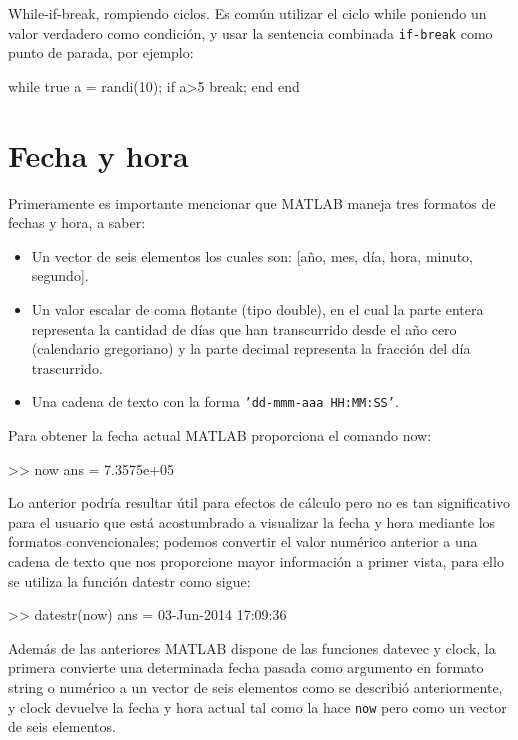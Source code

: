 \begin{informacion}{While-if-break, rompiendo ciclos.}
Es común utilizar el ciclo while poniendo un valor verdadero como condición, y 
usar la sentencia combinada \texttt{if-break} como punto de parada, por ejemplo:

\begin{matlab}
while true
    a = randi(10);
    if a>5
        break;
    end
end
\end{matlab}
\end{informacion}

\section{Fecha y hora}

Primeramente es importante mencionar que MATLAB maneja tres formatos de
fechas y hora, a saber:

\begin{itemize}
\item
  Un vector de seis elementos los cuales son: {[}año, mes, día, hora,
  minuto, segundo{]}.
\item
  Un valor escalar de coma flotante (tipo double), en el cual la parte
  entera representa la cantidad de días que han transcurrido desde el
  año cero (calendario gregoriano) y la parte decimal representa la
  fracción del día trascurrido.
\item
  Una cadena de texto con la forma \texttt{’dd-mmm-aaa\ HH:MM:SS’}.
\end{itemize}

Para obtener la fecha actual MATLAB proporciona el comando now:

\begin{matlab}
>> now
ans =
   7.3575e+05
\end{matlab}

Lo anterior podría resultar útil para efectos de cálculo pero no es tan
significativo para el usuario que está acostumbrado a visualizar la
fecha y hora mediante los formatos convencionales; podemos convertir el
valor numérico anterior a una cadena de texto que nos proporcione mayor
información a primer vista, para ello se utiliza la función datestr como
sigue:

\begin{matlab}
>> datestr(now)
ans =
03-Jun-2014 17:09:36
\end{matlab}

Además de las anteriores MATLAB dispone de las funciones datevec y
clock, la primera convierte una determinada fecha pasada como argumento
en formato string o numérico a un vector de seis elementos como se
describió anteriormente, y clock devuelve la fecha y hora actual tal
como la hace \texttt{now} pero como un vector de seis elementos. \\


